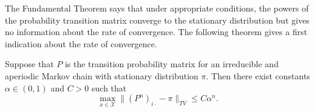 \documentclass[12pt]{article}
\begin{document}
\begin{enumerate}
\begin{remark}
    The Fundamental Theorem says that under appropriate conditions, the
    powers of the probability transition matrix converge to the
    stationary distribution but gives no information about the rate of
    convergence.  The following theorem gives a first indication about
    the rate of convergence.
\end{remark}

\begin{theorem}
    Suppose that \( P \) is the transition probability matrix for an
    irreducible and aperiodic Markov chain with stationary distribution \(
    \pi \).  Then there exist constants \( \alpha \in (0,1) \) and \( C
    > 0 \) such that
    \[
        \max_{x \in \mathcal{X}} \| (P^n)_{i \cdot} - \pi \|_{TV} \le C
        \alpha^n.
    \]
\end{theorem}


\end{enumerate}
\end{document}
